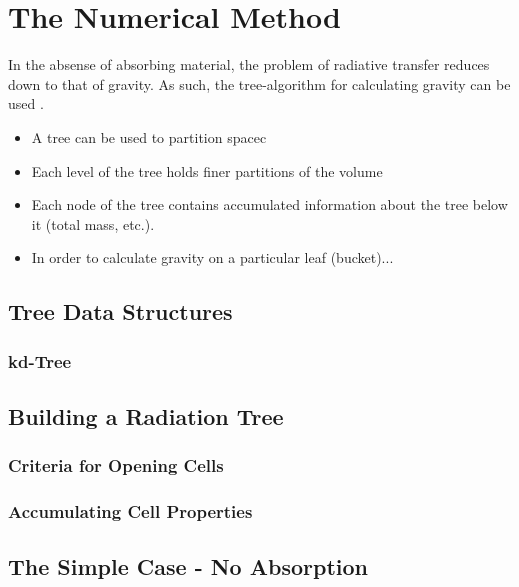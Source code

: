\pagestyle{fancy}
\headheight 20pt
\chead{}
\lfoot{}
\cfoot{\thepage}
\rfoot{}
\renewcommand{\headrulewidth}{0.1pt}
\renewcommand{\footrulewidth}{0.1pt}

\chapter{The Numerical Method}
\label{chap:method}
\thispagestyle{fancy}

In the absense of absorbing material, the problem of radiative transfer reduces down to that of gravity. As such, the tree-algorithm for calculating gravity can be used \citep{barnesHut86}.

\begin{itemize}
\item A tree can be used to partition spacec
\item Each level of the tree holds finer partitions of the volume
\item Each node of the tree contains accumulated information about the tree below it (total mass, etc.).
\item In order to calculate gravity on a particular leaf (bucket)...
\end{itemize}

\section{Tree Data Structures}

\subsection{kd-Tree}

\section{Building a Radiation Tree}

\subsection{Criteria for Opening Cells}

\subsection{Accumulating Cell Properties}

\section{The Simple Case - No Absorption}

